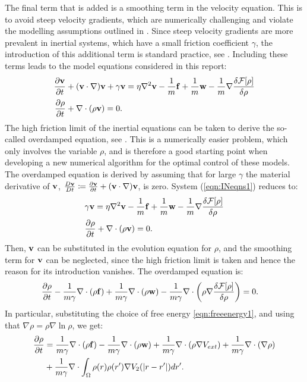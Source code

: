 The final term that is added is a smoothing term in the velocity equation. This is to avoid steep velocity gradients, which are numerically challenging and violate the modelling assumptions outlined in \cite{Archer1}. Since steep velocity gradients are more prevalent in inertial systems, which have a small friction coefficient $\gamma$, the introduction of this additional term is standard practice, see \cite{Archer1}.
Including these terms leads to the model equations considered in this report:
\begin{align}
	\label{eqn:INeqns1}
	\frac{\partial \mathbf{v}}{\partial t} &+ (\mathbf{v} \cdot \nabla)\mathbf{v} + \gamma \mathbf{v} = \eta \nabla^2 \mathbf{v}  -\frac{1}{m}\mathbf{f} +\frac{1}{m}\mathbf{w} - \frac{1}{m}\nabla \frac{\delta \mathcal{F}[\rho]}{\delta \rho}\\
	\frac{\partial \rho}{\partial t} &+ \nabla \cdot (\rho \mathbf{v})=0. \notag
\end{align}
The high friction limit of the inertial equations can be taken to derive the so-called overdamped equation, see \cite{Archer1}. This is a numerically easier problem, which only involves the variable $\rho$, and is therefore a good starting point when developing a new numerical algorithm for the optimal control of these models. 
The overdamped equation is derived by assuming that for large $\gamma$ the material derivative of $\mathbf{v}$, $\frac{D \mathbf{v}}{D t} \coloneqq  \frac{\partial \mathbf{v}}{\partial t} + (\mathbf{v} \cdot \nabla)\mathbf{v} $, is zero.
System (\ref{eqn:INeqns1}) reduces to:
\begin{align*}
	&\gamma \mathbf{v} = \eta \nabla^2 \mathbf{v}  -\frac{1}{m}\mathbf{f} +\frac{1}{m}\mathbf{w} - \frac{1}{m}\nabla \frac{\delta \mathcal{F}[\rho]}{\delta \rho}\\
	&\frac{\partial \rho}{\partial t} + \nabla \cdot (\rho \mathbf{v})=0 \notag.
\end{align*}
Then, $\mathbf{v}$ can be substituted in the evolution equation for $\rho$, and the smoothing term for $\mathbf{v}$ can be neglected, since the high friction limit is taken and hence the reason for its introduction vanishes. The overdamped equation is:
\begin{align*}
	&\frac{\partial \rho}{\partial t} -\frac{1}{m \gamma}\nabla \cdot (\rho \mathbf{f}) +\frac{1}{m \gamma} \nabla \cdot (\rho \mathbf{w}) - \frac{1}{m \gamma}\nabla \cdot \bigg(\rho\nabla \frac{\delta \mathcal{F}[\rho]}{\delta \rho}\bigg)=0 \notag.
\end{align*}
In particular, substituting the choice of free energy \eqref{eqn:freeenergy1}, and using that $\nabla \rho = \rho\nabla \ln \rho$, we get:
\begin{align*}
	\frac{\partial \rho}{\partial t} &= \frac{1}{m \gamma}\nabla \cdot (\rho \mathbf{f}) -\frac{1}{m \gamma} \nabla \cdot (\rho \mathbf{w})  + \frac{1}{m \gamma}\nabla \cdot (\rho\nabla V_{ext}) + \frac{1}{m \gamma}\nabla \cdot (\nabla \rho) \\
	&+\frac{1}{m \gamma}\nabla \cdot \int_\Omega \rho(r)\rho(r') \nabla V_2(|r-r'|)dr'\notag.
\end{align*}
